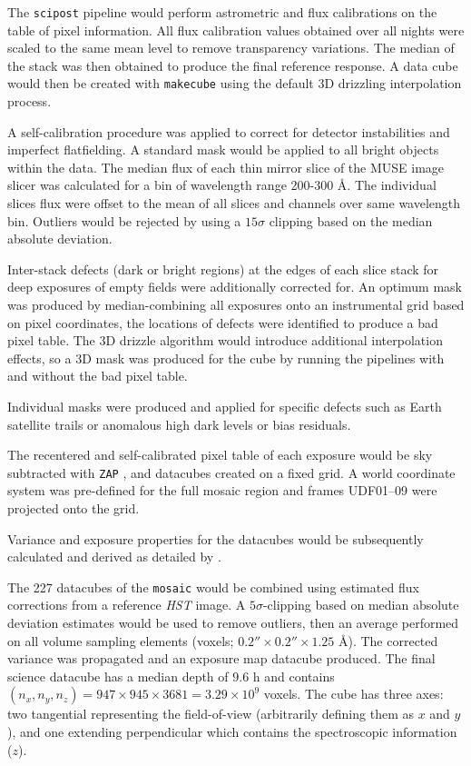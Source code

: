 \documentclass[12pt, twocolumn, nofootinbib]{revtex4-1}    %
\begin{document}
The \texttt{scipost} pipeline would perform astrometric and flux calibrations on the table of pixel information. All flux calibration values obtained over all nights were scaled to the same mean level to remove transparency variations. The median of the stack was then obtained to produce the final reference response. A data cube would then be created with \texttt{makecube} using the default 3D drizzling interpolation process. 

A self-calibration procedure was applied to correct for detector instabilities and imperfect flatfielding. A standard mask would be applied to all bright objects within the data. The median flux of each thin mirror slice of the MUSE image slicer was calculated for a bin of wavelength range 200-300 {\AA}. The individual slices flux were offset to the mean of all slices and channels over same wavelength bin. Outliers would be rejected by using a $15\sigma$ clipping based on the median absolute deviation.

Inter-stack defects (dark or bright regions) at the edges of each slice stack for deep exposures of empty fields were additionally corrected for. An optimum mask was produced by median-combining all exposures onto an instrumental grid based on pixel coordinates, the locations of defects were identified to produce a bad pixel table. The 3D drizzle algorithm would introduce additional interpolation effects, so a 3D mask was produced for the cube by running the pipelines with and without the bad pixel table. 

Individual masks were produced and applied for specific defects such as Earth satellite trails or anomalous high dark levels or bias residuals. 

The recentered and self-calibrated pixel table of each exposure would be sky subtracted with \texttt{ZAP} \citep{2016MNRAS.458.3210S}, and datacubes created on a fixed grid. A world coordinate system was pre-defined for the full mosaic region and frames UDF01--09 were projected onto the grid. 

Variance and exposure properties for the datacubes would be subsequently calculated and derived as detailed by \cite{2017A&A...608A...1B}. 

The 227 datacubes of the \texttt{mosaic} would be combined using estimated flux corrections from a reference \textit{HST} image. A $5\sigma$-clipping based on median absolute deviation estimates would be used to remove outliers, then an average performed on all volume sampling elements (voxels; $0.2''\times0.2''\times1.25$ \AA). The corrected variance was propagated and an exposure map datacube produced. The final science datacube has a median depth of $9.6$ h and contains $(n_x, n_y, n_z)=947\times 945\times 3681=3.29 \times 10^9$ voxels. The cube has three axes: two tangential representing the field-of-view (arbitrarily defining them as $x$ and $y$), and one extending perpendicular which contains the spectroscopic information ($z$). 
\end{document}
